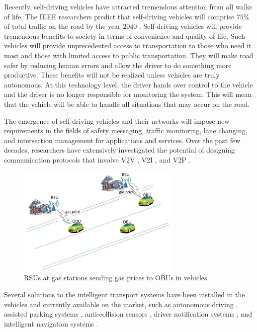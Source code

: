 \documentclass[conference]{IEEEtran}
\theoremstyle{definition}
\begin{document}
Recently, self-driving vehicles have attracted tremendous attention from all walks of life. The IEEE researchers predict that self-driving vehicles will comprise $75\%$ of total traffic on the road by the year $2040$ \cite{IEEEPrediction}.  Self-driving vehicles will provide tremendous benefits to society in terms of convenience and quality of life. Such vehicles will provide unprecedented access to transportation to those who need it most and those with limited access to public transportation. They will make road safer by reducing human errors and allow the driver to do something more productive. These benefits will not be realized unless vehicles are truly autonomous. At this technology level, the driver hands over control to the vehicle and the driver is no longer responsible for monitoring the system.  This will mean that the vehicle will be able to handle all situations that may occur on the road.

The emergence of self-driving vehicles and their networks will impose new requirements in the fields of safety messaging, traffic monitoring, lane changing, and intersection management for applications and services. Over the past few decades, researchers have extensively investigated the potential of designing communication protocols  that involve V2V \cite{Abbasi2018, Demba2018}, V2I \cite{Noh2015, Silva2018}, and V2P \cite{Bian2018, Corchero2018}.

\begin{figure}
\centering
\includegraphics[width=3.08in]{v2i.eps}
\caption{RSUs at gas stations sending gas prices to OBUs in vehicles }
\label{v2i}
\vspace{-0.3cm}
\end{figure}

Several solutions to the intelligent transport systems have been installed in the vehicles and currently available on the market, such as autonomous driving \cite{Arena2018}, assisted parking systems \cite{Liu2018}, anti-collision sensors \cite{Sanjana2017}, driver notification systems \cite{Tijerina2016}, and intelligent navigation systems \cite{Zhang2016}.
\end{document}

